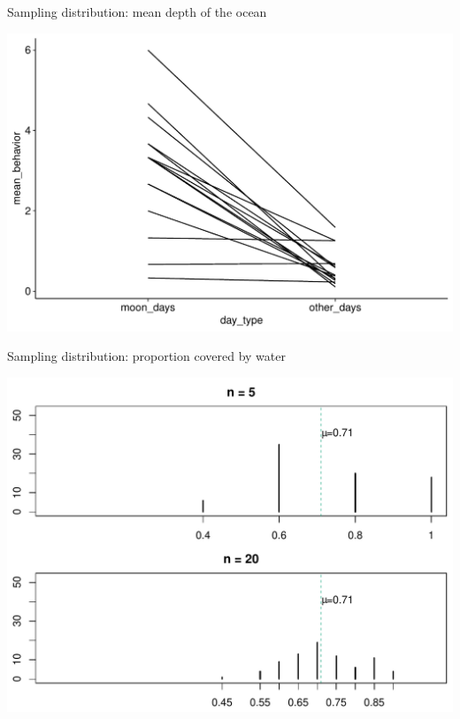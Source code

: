 \documentclass[10pt,handout]{beamer}\usepackage[]{graphicx}\usepackage[]{color}
\makeatletter
\def\maxwidth{ %
  \ifdim\Gin@nat@width>\linewidth
    \linewidth
  \else
    \Gin@nat@width
  \fi
}
\newenvironment{knitrout}{}{} %
\makeatother
\begin{document}
\begin{frame}[fragile]{Sampling distribution: mean depth of the ocean}
	

	
\begin{knitrout}\tiny
{}\color{fgcolor}

{\centering \includegraphics[width=\maxwidth]{figure/unnamed-chunk-9-1} 

}



\end{knitrout}
	
\end{frame}



\begin{frame}[fragile]{Sampling distribution: proportion covered by water}
	

	
	
\begin{knitrout}\tiny
{}\color{fgcolor}

{\centering \includegraphics[width=\maxwidth]{figure/unnamed-chunk-11-1} 

}



\end{knitrout}
	
\end{frame}
\end{document}
